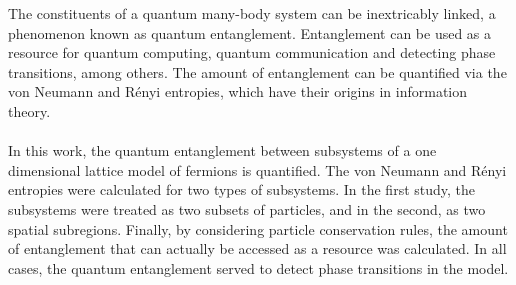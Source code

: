 The constituents of a quantum many-body system can be inextricably linked, a phenomenon known as quantum entanglement. Entanglement can be used as a resource for quantum computing, quantum communication and detecting phase transitions, among others. The amount of entanglement can be quantified via the von Neumann and R\'enyi entropies, which have their origins in information theory.
\\
\\
In this work, the quantum entanglement between subsystems of a one dimensional lattice model of fermions is quantified. The von Neumann and R\'enyi entropies were calculated for two types of subsystems. In the first study, the subsystems were treated as two subsets of particles, and in the second, as two spatial subregions. Finally, by considering particle conservation rules, the amount of entanglement that can actually be accessed as a resource was calculated. In all cases, the quantum entanglement served to detect phase transitions in the model. 